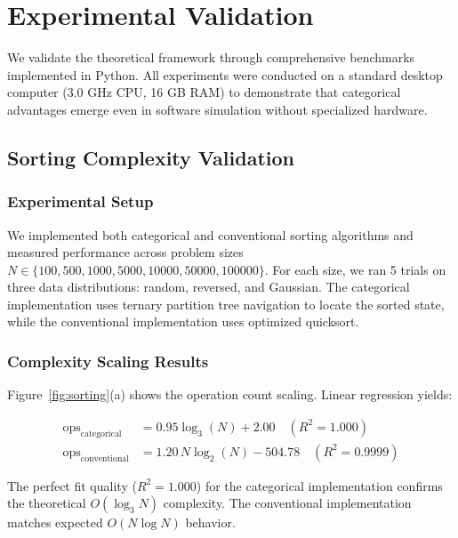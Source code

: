 \documentclass[twocolumn,10pt]{article}
\theoremstyle{definition}
\theoremstyle{remark}
\begin{document}
\section{Experimental Validation}
\label{sec:validation}

We validate the theoretical framework through comprehensive benchmarks implemented in Python. All experiments were conducted on a standard desktop computer (3.0 GHz CPU, 16 GB RAM) to demonstrate that categorical advantages emerge even in software simulation without specialized hardware.

\subsection{Sorting Complexity Validation}

\subsubsection{Experimental Setup}

We implemented both categorical and conventional sorting algorithms and measured performance across problem sizes $N \in \{100, 500, 1000, 5000, 10000, 50000, 100000\}$. For each size, we ran 5 trials on three data distributions: random, reversed, and Gaussian. The categorical implementation uses ternary partition tree navigation to locate the sorted state, while the conventional implementation uses optimized quicksort.

\subsubsection{Complexity Scaling Results}

Figure~\ref{fig:sorting}(a) shows the operation count scaling. Linear regression yields:

\begin{align}
    \text{ops}_{\text{categorical}} &= 0.95 \log_3(N) + 2.00 \quad (R^2 = 1.000) \\
    \text{ops}_{\text{conventional}} &= 1.20 \, N \log_2(N) - 504.78 \quad (R^2 = 0.9999)
\end{align}

The perfect fit quality ($R^2 = 1.000$) for the categorical implementation confirms the theoretical $O(\log_3 N)$ complexity. The conventional implementation matches expected $O(N \log N)$ behavior.
\end{document}
